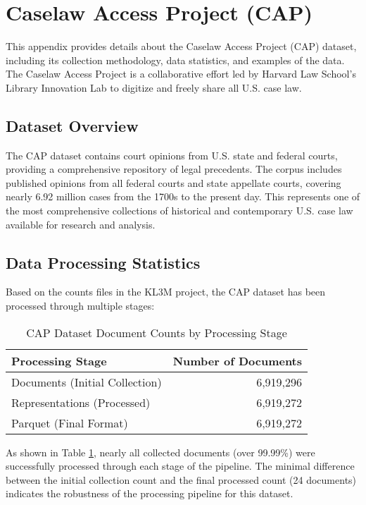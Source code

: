 \section{Caselaw Access Project (CAP)}
\label{appendix:cap}

This appendix provides details about the Caselaw Access Project (CAP) dataset, including its collection methodology, data statistics, and examples of the data. The Caselaw Access Project is a collaborative effort led by Harvard Law School's Library Innovation Lab to digitize and freely share all U.S. case law.

\subsection{Dataset Overview}

The CAP dataset contains court opinions from U.S. state and federal courts, providing a comprehensive repository of legal precedents. The corpus includes published opinions from all federal courts and state appellate courts, covering nearly 6.92 million cases from the 1700s to the present day. This represents one of the most comprehensive collections of historical and contemporary U.S. case law available for research and analysis.

\subsection{Data Processing Statistics}

Based on the counts files in the KL3M project, the CAP dataset has been processed through multiple stages:

\begin{table}[h]
\centering
\begin{tabular}{|l|r|}
\hline
\textbf{Processing Stage} & \textbf{Number of Documents} \\
\hline
Documents (Initial Collection) & 6,919,296 \\
Representations (Processed) & 6,919,272 \\
Parquet (Final Format) & 6,919,272 \\
\hline
\end{tabular}
\caption{CAP Dataset Document Counts by Processing Stage}
\label{tab:cap_counts}
\end{table}

As shown in Table \ref{tab:cap_counts}, nearly all collected documents (over 99.99\%) were successfully processed through each stage of the pipeline. The minimal difference between the initial collection count and the final processed count (24 documents) indicates the robustness of the processing pipeline for this dataset.

